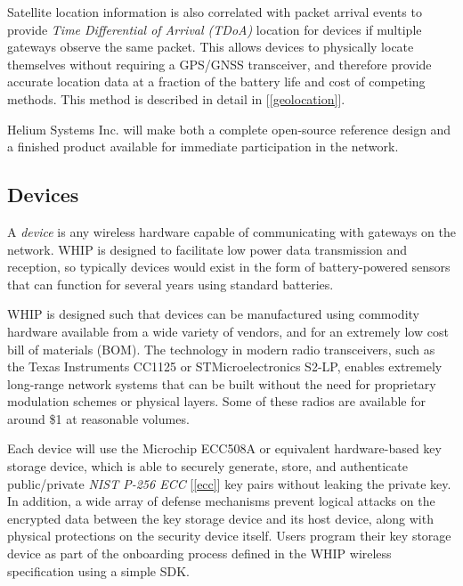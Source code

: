 \documentclass[letterpaper,11pt]{article}
\begin{document}
Satellite location information is also correlated with packet arrival events to provide \textit{Time Differential of Arrival (TDoA)} location for devices if multiple gateways observe the same packet. This allows devices to physically locate themselves without requiring a GPS/GNSS transceiver, and therefore provide accurate location data at a fraction of the battery life and cost of competing methods. This method is described in detail in [\ref{geolocation}].\newline

Helium Systems Inc. will make both a complete open-source reference design and a finished product available for immediate participation in the network.

\subsection{Devices} \label{devices}

A \textit{device} is any wireless hardware capable of communicating with gateways on the network. WHIP is designed to facilitate low power data transmission and reception, so typically devices would exist in the form of battery-powered sensors that can function for several years using standard batteries.\newline

WHIP is designed such that devices can be manufactured using commodity hardware available from a wide variety of vendors, and for an extremely low cost bill of materials (BOM). The technology in modern radio transceivers, such as the Texas Instruments CC1125 or STMicroelectronics S2-LP, enables extremely long-range network systems that can be built without the need for proprietary modulation schemes or physical layers. Some of these radios are available for around \$1 at reasonable volumes.\newline

Each device will use the Microchip ECC508A\cite{ecc} or equivalent hardware-based key storage device, which is able to securely generate, store, and authenticate public/private \textit{NIST P-256 ECC} [\ref{ecc}] key pairs without leaking the private key. In addition, a wide array of defense mechanisms prevent logical attacks on the encrypted data between the key storage device and its host device, along with physical protections on the security device itself. Users program their key storage device as part of the onboarding process defined in the WHIP wireless specification using a simple SDK.
\end{document}
